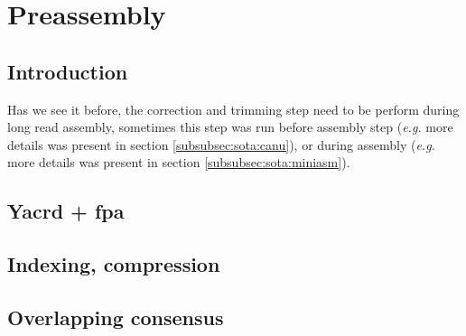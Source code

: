 \documentclass[main.tex]{subfiles}
\begin{document}
\chapter{Preassembly}

\section{Introduction}

Has we see it before, the correction and trimming step need to be perform during long read assembly, sometimes this step was run before assembly step (\textit{e.g.} \canu more details was present in section \ref{subsubsec:sota:canu}), or during assembly (\textit{e.g.} \miniasm more details was present in section \ref{subsubsec:sota:miniasm}).




\section{Yacrd + fpa}

\section{Indexing, compression}

\section{Overlapping consensus}

\end{document}
